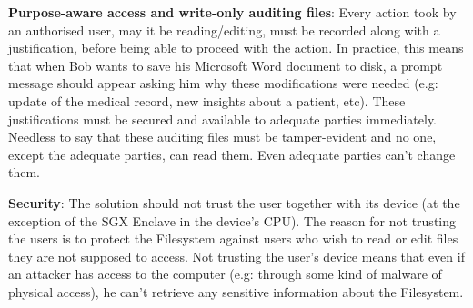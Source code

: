 \documentclass[../main.tex]{subfiles}
\begin{document}
\par \textbf{Purpose-aware access and write-only auditing files}: Every action took by an authorised user, may it be reading/editing, must be recorded along with a justification, before being able to proceed with the action. In practice, this means that when Bob wants to save his Microsoft Word document to disk, a prompt message should appear asking him why these modifications were needed (e.g: update of the medical record, new insights about a patient, etc). These justifications must be secured and available to adequate parties immediately. Needless to say that these auditing files must be tamper-evident and no one, except the adequate parties, can read them. Even adequate parties can't change them.
\par \textbf{Security}: The solution should not trust the user together with its device (at the exception of the SGX Enclave in the device's CPU). The reason for not trusting the users is to protect the Filesystem against users who wish to read or edit files they are not supposed to access. Not trusting the user's device means that even if an attacker has access to the computer (e.g: through some kind of malware of physical access), he can't retrieve any sensitive information about the Filesystem.
\end{document}
